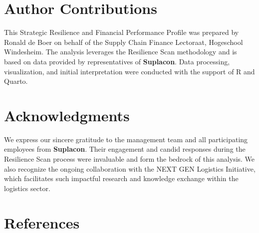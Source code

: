 \documentclass[
  oneside,
  open=any,
  fontsize=11pt]{scrbook}
\begin{document}
\chapter{Author Contributions}\label{author-contributions}

This Strategic Resilience and Financial Performance Profile was prepared
by Ronald de Boer on behalf of the Supply Chain Finance Lectoraat,
Hogeschool Windesheim. The analysis leverages the Resilience Scan
methodology and is based on data provided by representatives of
\textbf{Suplacon}. Data processing, visualization, and initial
interpretation were conducted with the support of R and Quarto.

\chapter{Acknowledgments}\label{acknowledgments}

We express our sincere gratitude to the management team and all
participating employees from \textbf{Suplacon}. Their engagement and
candid responses during the Resilience Scan process were invaluable and
form the bedrock of this analysis. We also recognize the ongoing
collaboration with the NEXT GEN Logistics Initiative, which facilitates
such impactful research and knowledge exchange within the logistics
sector.

\chapter{References}\label{references}

\label{refs}


\backmatter
\end{document}
